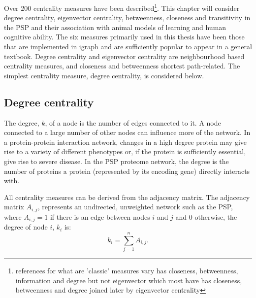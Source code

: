





Over 200 centrality measures have been described\cite{jalili2015centiserver}\footnote{references for what are 'classic' measures vary \cite{cadini2008using} has closeness, betweenness, information and degree but not eigenvector which most have \cite{brandes2016maintaining} has closeness, betweenness and degree joined later by eigenvector centrality}. This chapter will consider degree centrality, eigenvector centrality, betweenness, closeness and transitivity in the PSP and their association with animal models of learning and human cognitive ability. The six measures primarily used in this thesis have been those that are implemented in igraph and are sufficiently popular to appear in a general textbook\cite{newman2018networks}. Degree centrality and eigenvector centrality are neighbourhood based centrality measures, and closeness and betweenness shortest path-related\cite{kardos2020stability}. The simplest centrality measure, degree centrality, \cite{newman2018networks} is considered below. 

\subsection{Degree centrality}
\label{sec:degree centrality}

The degree, $k$, of a node is the number of edges connected to it. A node connected to a large number of other nodes can influence more of the network. In a protein-protein interaction network, changes in a high degree protein may give rise to a variety of different phenotypes or, if the protein is sufficiently essential, give rise to severe disease.  In the PSP proteome network, the degree is the number of proteins a protein (represented by its encoding gene) directly interacts with.


All centrality measures can be derived from the adjacency matrix. The adjacency matrix $A_{i,j}$, represents an undirected, unweighted network such as the PSP,  where $A_{i,j}=1$  if there is an edge between nodes $i$ and $j$ and 0 otherwise, the degree of node $i$, $k_i$ is\cite{boccaletti2006complex}:
\begin{equation}
k_i = \sum_{j=1}^n A_{i,j}.
\label{Equation:Degree_from_adjacency}
\end{equation}

